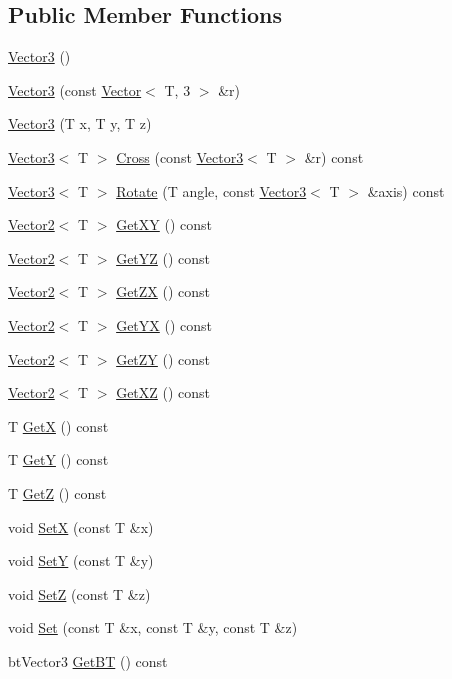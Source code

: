 \subsection*{Public Member Functions}
\begin{DoxyCompactItemize}
\item 
\hyperlink{class_vector3_a54f99f4211298d5245ea578bdd5143cc}{Vector3} ()
\item 
\hyperlink{class_vector3_a7e08c09700f976416b4692a077087615}{Vector3} (const \hyperlink{class_vector}{Vector}$<$ T, 3 $>$ \&r)
\item 
\hyperlink{class_vector3_a6797fe2b04a56b6b2ee517f23876ebab}{Vector3} (T x, T y, T z)
\item 
\hyperlink{class_vector3}{Vector3}$<$ T $>$ \hyperlink{class_vector3_a5ad3b7c9135180b76c48e47c95e6f93d}{Cross} (const \hyperlink{class_vector3}{Vector3}$<$ T $>$ \&r) const 
\item 
\hyperlink{class_vector3}{Vector3}$<$ T $>$ \hyperlink{class_vector3_a6d9ae17426f8721e5918003d9af027a7}{Rotate} (T angle, const \hyperlink{class_vector3}{Vector3}$<$ T $>$ \&axis) const 
\item 
\hyperlink{class_vector2}{Vector2}$<$ T $>$ \hyperlink{class_vector3_a8a5ca6e62a38b02ccdbdc17542873e61}{Get\+X\+Y} () const 
\item 
\hyperlink{class_vector2}{Vector2}$<$ T $>$ \hyperlink{class_vector3_af022b910b5a1d276745fd7be0b70daa7}{Get\+Y\+Z} () const 
\item 
\hyperlink{class_vector2}{Vector2}$<$ T $>$ \hyperlink{class_vector3_ae84d69bb63b947a449a7f9f6b022c1c4}{Get\+Z\+X} () const 
\item 
\hyperlink{class_vector2}{Vector2}$<$ T $>$ \hyperlink{class_vector3_a1d9b1de4017804cf39b2fca3ce3a1e41}{Get\+Y\+X} () const 
\item 
\hyperlink{class_vector2}{Vector2}$<$ T $>$ \hyperlink{class_vector3_af2ceba0c92219a584a599f9c7c493de6}{Get\+Z\+Y} () const 
\item 
\hyperlink{class_vector2}{Vector2}$<$ T $>$ \hyperlink{class_vector3_ad0004bbe1d6cf77e9e0e419102a093ad}{Get\+X\+Z} () const 
\item 
T \hyperlink{class_vector3_a7ebe403dc3badb8e5943a043a01d1dc6}{Get\+X} () const 
\item 
T \hyperlink{class_vector3_a2cb5b82371d17c70d8d37002d3300e76}{Get\+Y} () const 
\item 
T \hyperlink{class_vector3_ad6da696280e32d7b14ef897977e27f5a}{Get\+Z} () const 
\item 
void \hyperlink{class_vector3_ab447da00bb0176f3160edb743a7a0a19}{Set\+X} (const T \&x)
\item 
void \hyperlink{class_vector3_a65b71b95a49861281fcc60be10354d89}{Set\+Y} (const T \&y)
\item 
void \hyperlink{class_vector3_adc178cec4d4770d59881f19c5335edfe}{Set\+Z} (const T \&z)
\item 
void \hyperlink{class_vector3_af1f7474d44998863ad66e5e3c8221f9b}{Set} (const T \&x, const T \&y, const T \&z)
\item 
bt\+Vector3 \hyperlink{class_vector3_a95fadde3d5f34be5d64d1fee74d657fc}{Get\+B\+T} () const 
\end{DoxyCompactItemize}
